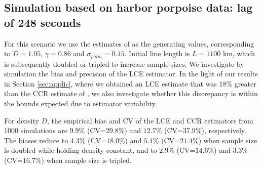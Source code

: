 \documentclass[useAMS, usenatbib, referee]{biom}\usepackage[]{graphicx}\usepackage[]{color}
\begin{document}

\subsection{Simulation based on harbor porpoise data: lag of 248 seconds}


For this scenario we use the estimates of \cite{Stevenson+al:19} as the generating values, corresponding to $D=1.05$, $\gamma=0.86$ and $\sigma_{palm}=0.15$. Initial line length is $L=1100$ km, which is subsequently doubled or tripled to increase sample sizes. We investigate by simulation the bias and precision of the LCE estimator. In the light of our results in Section \ref{sec:applic}, where we obtained an LCE estimate that was 18\% greater than the CCR estimate of \cite{Stevenson+al:19}, we also investigate whether this discrepancy is within the bounds expected due to estimator variability.





For density $D$, the empirical bias and CV of the LCE and CCR estimators from 1000 simulations are $9.9$\% (CV=$29.8$\%) and $12.7$\% (CV=$37.9$\%), respectively. The biases reduce to $4.3$\% (CV=$18.0$\%) and $5.1$\% (CV=$21.4$\%) when sample size is doubled while holding density constant, and to $2.9$\% (CV=$14.6$\%) and $3.3$\% (CV=$16.7$\%) when sample size is tripled.

\end{document}
